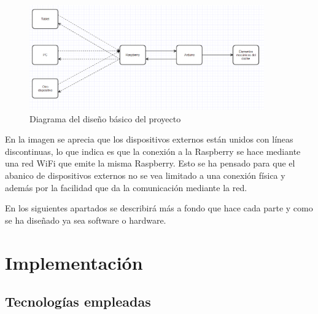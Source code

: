 \documentclass{pclass}
\begin{document}
	\begin{figure}[H]
		\centering
		\includegraphics[width=0.90\textwidth]{img/diseno}
		\caption{Diagrama del diseño básico del proyecto}
		\label{fig:diseno}
	\end{figure}

En la imagen se aprecia que los dispositivos externos están unidos con líneas discontinuas, lo que indica es que la conexión a la Raspberry se hace mediante una red WiFi que emite la misma Raspberry. Esto se ha pensado para que el abanico de dispositivos externos no se vea limitado a una conexión física y además por la facilidad que da la comunicación mediante la red.

En los siguientes apartados se describirá más a fondo que hace cada parte y como se ha diseñado ya sea software o hardware.
 
\section{Implementación} 
\subsection{Tecnologías empleadas}
\end{document}
